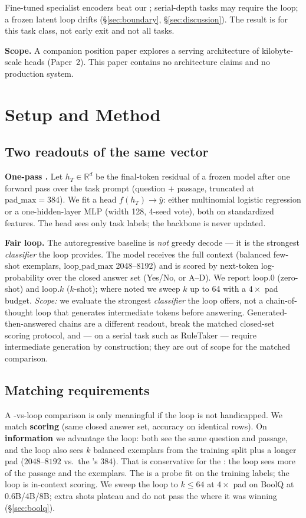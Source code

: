 Fine-tuned specialist encoders beat our \head{}; serial-depth tasks may
require the loop; a frozen latent loop drifts
(\S\ref{sec:boundary}, \S\ref{sec:discussion}). The result is for this task
class, not early exit and not all tasks.

\textbf{Scope.} A companion position paper explores a serving architecture of
kilobyte-scale \head{} heads (Paper~2). This paper contains no architecture
claims and no production system.

\section{Setup and Method}
\label{sec:setup}

\subsection{Two readouts of the same vector}

\textbf{One-pass \head{}.} Let $h_T \in \mathbb{R}^d$ be the final-token
residual of a frozen model after one forward pass over the task prompt
(question $+$ passage, truncated at $\mathrm{pad\_max}=384$). We fit a head
$f(h_T) \to \hat{y}$: either multinomial logistic regression or a
one-hidden-layer MLP (width 128, 4-seed vote), both on standardized features.
The head sees only task labels; the backbone is never updated.

\textbf{Fair loop.} The autoregressive baseline is \emph{not} greedy decode
--- it is the strongest \emph{classifier} the loop provides. The model receives the
full context (balanced few-shot exemplars, $\mathrm{loop\_pad\_max}$
2048--8192) and is scored by next-token log-probability over the closed answer
set (Yes/No, or A--D). We report loop.0 (zero-shot) and loop.$k$ ($k$-shot);
where noted we sweep $k$ up to 64 with a $4\times$ pad budget.
\emph{Scope:} we evaluate the strongest \emph{classifier} the loop offers, not
a chain-of-thought loop that generates intermediate tokens before answering.
Generated-then-answered chains are a different readout, break the matched
closed-set scoring protocol, and --- on a serial task such as RuleTaker ---
require intermediate generation by construction; they are out of scope for the
matched comparison.

\subsection{Matching requirements}

A \head{}-vs-loop comparison is only meaningful if the loop is not
handicapped. We match \textbf{scoring} (same closed answer set, accuracy on
identical rows). On \textbf{information} we advantage the loop: both see the
same question and passage, and the loop also sees $k$ balanced exemplars from
the training split plus a longer pad ($2048$--$8192$ vs.\ the \head{}'s
$384$). That is conservative for the \head{}: the loop sees more of the
passage and the exemplars. The \head{} is a probe fit on the training labels;
the loop is in-context scoring. We sweep the loop to $k{\le}64$ at
$4\times$ pad on BoolQ at 0.6B/4B/8B; extra shots plateau and do not pass the
\head{} where it was winning (\S\ref{sec:boolq}).

